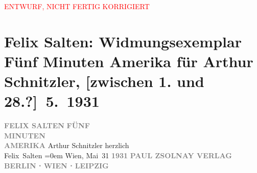 
\begin{center}
            \textcolor{red}{ENTWURF, NICHT FERTIG KORRIGIERT}
                      \end{center}
            
         \renewcommand{\erwaehnteInstitutionen}{Institutionen: Paul Zsolnay Verlag}
         \renewcommand{\erwaehnteOrte}{Orte: Berlin, Leipzig, Wien}
         \renewcommand{\erwaehnteWerke}{Werke: Fünf Minuten Amerika}
               \section[Felix Salten: Widmungsexemplar Fünf Minuten Amerika für Arthur Schnitzler, {[}zwischen 1. und 28.?{]} 5. 1931]{ Felix Salten: Widmungsexemplar Fünf Minuten Amerika für Arthur
               Schnitzler, {[}zwischen 1. und 28.?{]} 5. 1931}\nopagebreak{}\rehead{ }\begin{ledgroupsized}[t]{13cm}\normalsize\beginnumbering \toendnotes[C]{\smallbreak\pagebreak[2]} 
\pstart
           \noindent{}\centering{}{\pb}\textcolor{gray}{\textbf{FELIX SALTEN}}\pend
           \pstart
           \noindent{}\centering{}\textcolor{gray}{\textbf{FÜNF{\\}MINUTEN{\\}AMERIKA}}\pend
           {\bigskip}\pstart
           \noindent{}Arthur Schnitzler\pend
           \pstart
           herzlich{\\[\baselineskip]}\spacefill\mbox{Felix Salten}\pend
           \leftskip=0em{}\pstart
           Wien, Mai 31\pend
           {\bigskip}\pstart
           \noindent{}\centering{}\textcolor{gray}{\textbf{1931}}\pend
           \pstart
           \noindent{}\centering{}\textcolor{gray}{\textbf{PAUL ZSOLNAY VERLAG}}\pend
           \pstart
           \noindent{}\centering{}\textcolor{gray}{\textbf{BERLIN ⋅ WIEN ⋅ LEIPZIG}}\pend
           
         
         \endnumbering{}\end{ledgroupsized}\begin{anhang}\end{anhang}\newcommand{\dateiname}{L03049}\newcommand{\titel}{Felix Salten: Widmungsexemplar Fünf Minuten Amerika für Arthur Schnitzler, [zwischen 1. und 28.?] 5. 1931}\newcommand{\editorInnen}{Martin Anton Müller und Laura Untner}
      